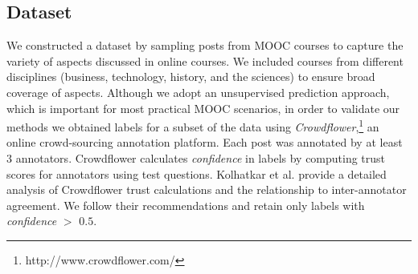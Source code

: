 
 \subsection{Dataset} 
 \label{sec:data}

We constructed a dataset by sampling posts from MOOC courses to capture the variety of aspects discussed in online courses. We included courses from different disciplines (business, technology, history, and the sciences) to ensure broad coverage of aspects.
Although we adopt an unsupervised prediction approach, which is important for most practical MOOC scenarios, in order to validate our methods we obtained labels for a subset of the data using \textit{Crowdflower},\footnote{http://www.crowdflower.com/} an online crowd-sourcing annotation platform. Each post was annotated by at least 3 annotators. Crowdflower calculates \textit{confidence} in labels by computing trust scores for annotators using test questions. Kolhatkar et al.  provide a detailed analysis of Crowdflower trust calculations and the relationship to inter-annotator agreement. We follow their recommendations and retain only labels with \textit{confidence} $>$ $0.5$.

